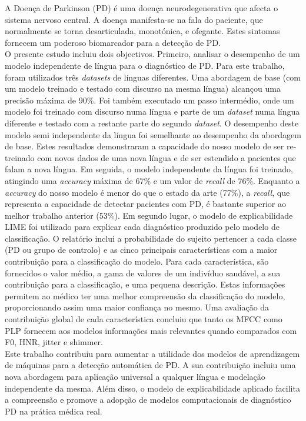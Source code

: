 A Doença de Parkinson (PD) é uma doença neurodegenerativa que afecta o sistema nervoso central. A doença manifesta-se na fala do paciente, que normalmente se torna desarticulada, monotónica, e ofegante. Estes sintomas fornecem um poderoso biomarcador para a detecção de PD. \\
O presente estudo incluiu dois objectivos. Primeiro, analisar o desempenho de um modelo independente de língua para o diagnóstico de PD. Para este trabalho, foram utilizados três \textit{datasets} de línguas diferentes. Uma abordagem de base (com um modelo treinado e testado com discurso na mesma língua) alcançou uma precisão máxima de 90\%. Foi também executado um passo intermédio, onde um modelo foi treinado com discurso numa língua e parte de um \textit{dataset} numa língua diferente e testado com a restante parte do segundo \textit{dataset}. O desempenho deste modelo semi independente da língua foi semelhante ao desempenho da abordagem de base. Estes resultados demonstraram a capacidade do nosso modelo de ser re-treinado com novos dados de uma nova língua e de ser estendido a pacientes que falam a nova língua. Em seguida, o modelo independente da língua foi treinado, atingindo uma \textit{accuracy} máxima de 67\% e um valor de \textit{recall} de 76\%. Enquanto a \textit{accuracy} do nosso modelo é menor do que o estado da arte (77\%), a \textit{recall}, que representa a capacidade de detectar pacientes com PD, é bastante superior ao melhor trabalho anterior (53\%). Em segundo lugar, o modelo de explicabilidade LIME foi utilizado para explicar cada diagnóstico produzido pelo modelo de classificação. O relatório inclui a probabilidade do sujeito pertencer a cada classe (PD ou grupo de controlo) e as cinco principais características com a maior contribuição para a classificação do modelo. Para cada característica, são fornecidos o valor médio, a gama de valores de um indivíduo saudável, a sua contribuição para a classificação, e uma pequena descrição. Estas informações permitem ao médico ter uma melhor compreensão da classificação do modelo, proporcionando assim uma maior confiança no mesmo. Uma avaliação da contribuição global de cada característica concluiu que tanto os MFCC como PLP fornecem aos modelos informações mais relevantes quando comparados com F0, HNR, jitter e shimmer. \\
Este trabalho contribuiu para aumentar a utilidade dos modelos de aprendizagem de máquinas para a detecção automática de PD. A sua contribuição incluiu uma nova abordagem para aplicação universal a qualquer língua e modelação independente da mesma. Além disso, o modelo de explicabilidade aplicado facilita a compreensão e promove a adopção de modelos computacionais de diagnóstico PD na prática médica real.
\newpage

